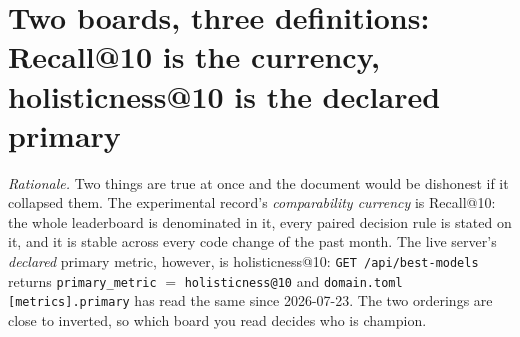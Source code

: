 \documentclass[11pt]{article}
\begin{document}
\clearpage
\section{Two boards, three definitions: Recall@10 is the currency, holisticness@10 is the declared primary}
\label{sec:metrics}

\emph{Rationale.} Two things are true at once and the document would be
dishonest if it collapsed them. The experimental record's \emph{comparability
currency} is Recall@10: the whole leaderboard is denominated in it, every paired
decision rule is stated on it, and it is stable across every code change of the
past month. The live server's \emph{declared} primary metric, however, is
holisticness@10: \texttt{GET /api/best-models} returns
\texttt{primary\_metric} $=$ \texttt{holisticness@10} and
\texttt{domain.toml [metrics].primary} has read the same since 2026-07-23. The
two orderings are close to inverted, so which board you read decides who is
champion.
\end{document}
